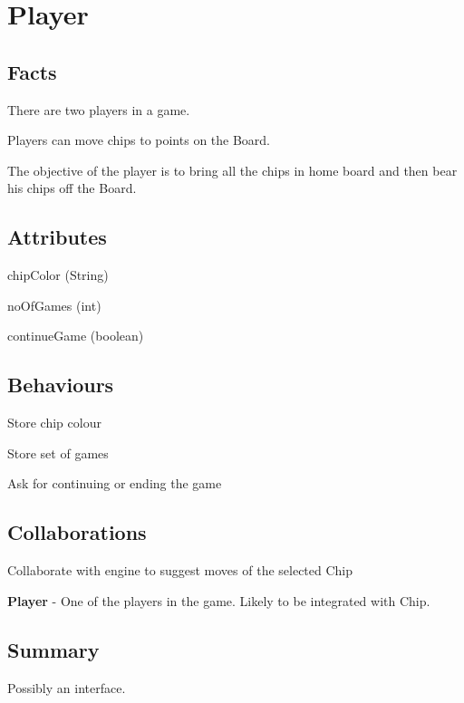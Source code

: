 \section{Player}

\subsection{Facts}

\begin{dashed}
    \item There are two players in a game.
    \item Players can move chips to points on the Board.
    \item The objective of the player is to bring all the chips in home board and then bear his chips off the Board.
\end{dashed}

\subsection{Attributes}

\begin{dashed}
    \item chipColor (String)
    \item noOfGames (int)
    \item continueGame (boolean)
\end{dashed}

\subsection{Behaviours}

\begin{dashed}
    \item Store chip colour
    \item Store set of games
    \item Ask for continuing or ending the game
\end{dashed}

\subsection{Collaborations}

\begin{dashed}
    \item Collaborate with engine to suggest moves of the selected Chip
\end{dashed}

\noindent
\newline\textbf{Player} - One of the players in the game. Likely to be integrated with Chip.

\subsection{Summary}
Possibly an interface.

